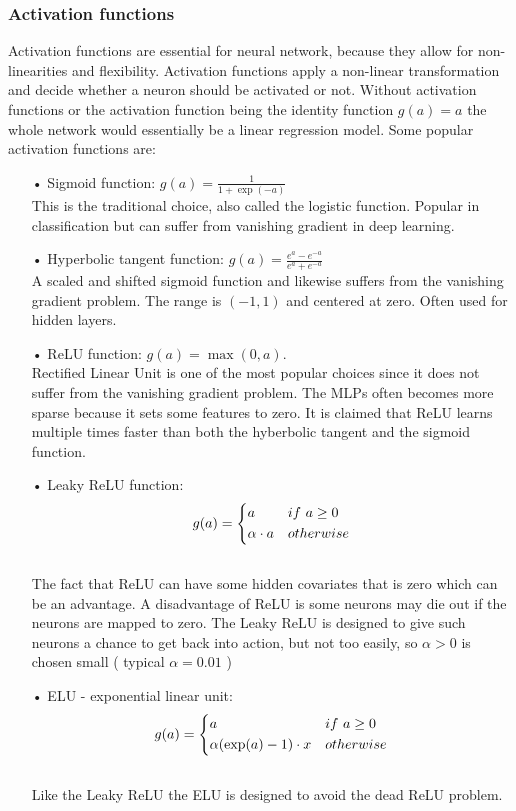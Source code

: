 \subsubsection{Activation functions}
Activation functions are essential for neural network, because they allow for non-linearities and flexibility. Activation functions apply a non-linear transformation and decide whether a neuron should be activated or not. Without activation functions or the activation function being the identity function $g(a)=a$ the whole network would essentially be a linear regression model. Some popular activation functions are:
\begin{enumerate}
\item[•] Sigmoid function: $g(a)=\frac{1}{1+\exp(-a)}$\\

This is the traditional choice, also called the logistic function. Popular in classification but can suffer from vanishing gradient in deep learning.
\item[•] Hyperbolic tangent function: $g(a)=\frac{e^a-e^{-a}}{e^a+e^{-a}}$\\

A scaled and shifted sigmoid function and likewise suffers from the vanishing gradient problem. The range is $(-1,1)$ and centered at zero. Often used for hidden layers.
\item[•] ReLU function: $g(a)=\max(0,a)$.\\

Rectified Linear Unit is one of the most popular choices since it does not suffer from the vanishing gradient problem. The MLPs often becomes more sparse because it sets some features to zero. It is claimed that ReLU learns multiple times faster than both the hyberbolic tangent and the sigmoid function.
\item[•] Leaky ReLU function:  \[ g(a)=
    \begin{dcases}
        a & if \ a \geq 0 \\
        \alpha \cdot a & otherwise \\
    \end{dcases}
\]\\
The fact that ReLU can have some hidden covariates that is zero which can be an advantage. A disadvantage of ReLU is some neurons may die out if the neurons are mapped to zero. The Leaky ReLU is designed to give such neurons a chance to get back into action, but not too easily, so $\alpha>0$ is chosen small ( typical $\alpha=0.01$ ) 

\item[•] ELU - exponential linear unit:  \[ g(a)=
    \begin{dcases}
        a & if \ a \geq 0 \\
        \alpha(\exp(a)-1) \cdot x & otherwise \\
    \end{dcases}
\]\\
Like the Leaky ReLU the ELU is designed to avoid the dead ReLU problem. 
\end{enumerate}

